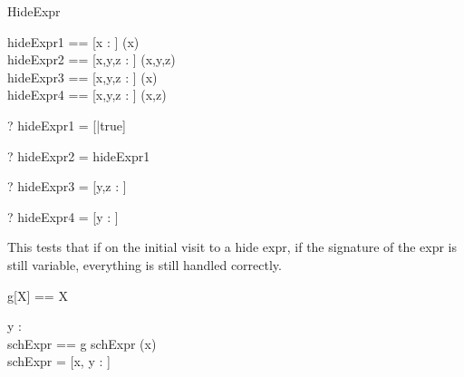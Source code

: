 \begin{zsection}
  \SECTION HideExpr
\end{zsection}

\begin{zed}
  hideExpr1 == [x : \nat] \hide (x) \\
  hideExpr2 == [x,y,z : \nat] \hide (x,y,z) \\
  hideExpr3 == [x,y,z : \nat] \hide (x)\\
  hideExpr4 == [x,y,z : \nat] \hide (x,z)\\
\end{zed}

\begin{zed} \vdash? hideExpr1 = [|true] \end{zed}
\begin{zed} \vdash? hideExpr2 = hideExpr1 \end{zed}
\begin{zed} \vdash? hideExpr3 = [y,z : \nat] \end{zed}
\begin{zed} \vdash? hideExpr4 = [y : \nat] \end{zed}

This tests that if on the initial visit to a hide expr, if the
signature of the expr is still variable, everything is still handled
correctly.

\begin{zed}
  g[X] == X
\end{zed}

\begin{axdef}
  y : \nat\\
  schExpr == g
\where
  schExpr \hide (x)\\
  schExpr = [x, y : \nat]
\end{axdef}
